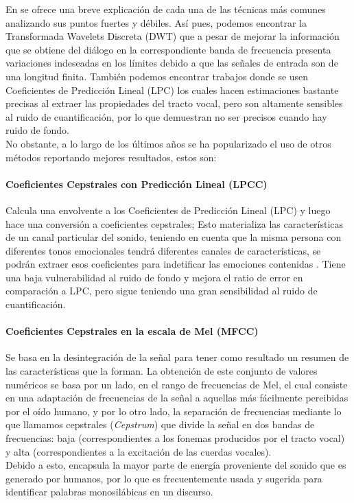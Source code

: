 \documentclass[11pt,a4paper,spanish]{book}
\begin{document}

	
	En \cite{Rashid2018} se ofrece una breve explicación de cada una de las técnicas más comunes analizando sus puntos fuertes y débiles. Así pues, podemos encontrar la Transformada Wavelets Discreta (DWT) que a pesar de mejorar la información que se obtiene del diálogo en la correspondiente banda de frecuencia presenta variaciones indeseadas en los límites debido a que las señales de entrada son de una longitud finita. También podemos encontrar trabajos donde se usen Coeficientes de Predicción Lineal (LPC) los cuales hacen estimaciones bastante precisas al extraer las propiedades del tracto vocal, pero son altamente sensibles al ruido de cuantificación, por lo que demuestran no ser precisos cuando hay ruido de fondo. \\
	
	No obstante, a lo largo de los últimos años se ha popularizado el uso de otros métodos reportando mejores resultados, estos son:
	
	\paragraph{Coeficientes Cepstrales con Predicción Lineal (LPCC)}
	Calcula una envolvente a los Coeficientes de Predicción Lineal (LPC) y luego hace una conversión a coeficientes cepstrales; Esto materializa las características de un canal particular del sonido, teniendo en cuenta que la misma persona con diferentes tonos emocionales tendrá diferentes canales de características, se podrán extraer esos coeficientes para indetificar las emociones contenidas \cite{Sandesara2020}.
	Tiene una baja vulnerabilidad al ruido de fondo y mejora el ratio de error en comparación a LPC, pero sigue teniendo una gran sensibilidad al ruido de cuantificación.\hfill \break
	
	\paragraph{Coeficientes Cepstrales en la escala de Mel (MFCC)}
	Se basa en la desintegración de la señal para tener como resultado un resumen de las características que la forman. La obtención de este conjunto de valores numéricos se basa por un lado, en el rango de frecuencias de Mel, el cual consiste en una adaptación de frecuencias de la señal a aquellas más fácilmente percibidas por el oído humano, y por lo otro lado, la separación de frecuencias mediante lo que llamamos cepstrales (\emph{Cepstrum}) que divide la señal en dos bandas de frecuencias: baja (correspondientes a los fonemas producidos por el tracto vocal) y alta (correspondientes a la excitación de las cuerdas vocales). \\
	Debido a esto, encapsula la mayor parte de energía proveniente del sonido que es generado por humanos, por lo que es frecuentemente usada y sugerida para identificar palabras monosilábicas en un discurso.\hfill \break
	
\end{document}
